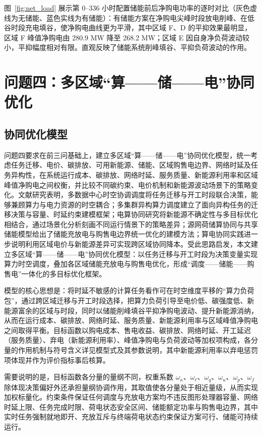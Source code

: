 \documentclass{ctexart}
\begin{document}
图~\ref{fig:net_load} 展示第 0–336 小时配置储能前后净购电功率的逐时对比（灰色虚线为无储能、蓝色实线为有储能）：有储能方案在净购电尖峰时段放电削峰、在低谷时段充电填谷，使净购电曲线更为平滑，其中区域 F、D 的平抑效果最明显，区域 F 峰值净购电由 280.9 MW 降至 268.2 MW；区域 E 因自身净负荷波动较小，平抑幅度相对有限。直观反映了储能系统削峰填谷、平抑负荷波动的作用。
\section{问题四：多区域“算——储——电”协同优化}
\subsection{协同优化模型}

问题四要求在前三问基础上，建立多区域“算——储——电”协同优化模型，统一考虑任务迁移、电价、碳排放、可用新能源、储能、区域购售电边界、网络时延及任务异构性，在系统运行成本、碳排放、网络时延、服务质量、新能源利用率和区域峰值净购电之间权衡，并比较不同碳约束、电价机制和新能源波动场景下的策略变化。文献研究表明，多数据中心时空协调调度将任务迁移与开工时段联合决策，能够兼顾算力与电力资源的时空耦合\cite{liu2026}；多集群异构算力调度建立了面向异构任务的迁移决策与容量、时延约束建模框架\cite{yangshouzhan2024}；电算协同研究将新能源不确定性与多目标优化相结合，通过场景化分析刻画不同运行情景下的策略差异\cite{wangyihang2026}；源网荷储算协同与共享储能模型给出了储能充放电与购售电边界统一优化的建模方法\cite{fanxiaochao2026,qie2026}；算电协同实践进一步说明利用区域电价与新能源差异可实现跨区域协同降本\cite{fuzhi2026}。受此思路启发，本文建立多区域“算——储——电”协同优化模型：以任务迁移与开工时段为决策变量实现算力时空调度，叠加各区域储能充放电与购售电优化，形成“调度——储能——购售电”一体化的多目标优化框架。

模型的核心思想是：将时延不敏感的计算任务看作可在时空维度平移的“算力负荷包”，通过跨区域迁移与开工时段选择，把算力负荷引导至电价低、碳强度低、新能源富余的区域与时段，同时以储能削峰填谷平抑净购电波动、提升新能源消纳，从而在运行成本、碳排放、网络时延、服务质量、新能源利用率与区域峰值净购电之间取得平衡。目标函数以购电成本、售电收益、碳排放、网络时延、开工延迟（服务质量）、弃电（新能源利用率）、峰值净购电与负荷波动等加权项构成，各分量的作用机制与符号含义详见模型式及其参数说明，其中新能源利用率以弃电惩罚项体现并作为评价指标事后核算。

需要说明的是，目标函数各分量的量纲不同，权重系数 $\omega_\kappa$、$\omega_\ell$、$\omega_q$、$\omega_u$、$\omega_p$、$\omega_f$ 除体现决策偏好外还承担量纲协调作用，其取值使各分量处于相近量级，从而实现加权标量化。约束条件保证任何调度与充放电方案均不违反图形处理器容量、网络时延上限、任务完成时限、荷电状态安全区间、储能额定功率与购售电边界，其中实时任务强制就地即开、充放互斥与终端荷电状态约束保证方案可行、储能可持续运行。
\end{document}

